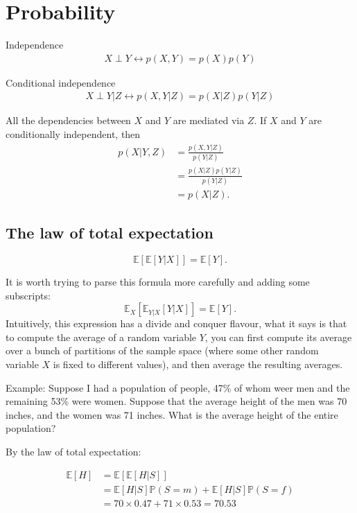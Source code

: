 \section{Probability}
\label{sec:intro_prob}

\begin{definition}{Independence}
	\begin{align*}
		X\perp Y \leftrightarrow p(X,Y)=p(X)p(Y)
	\end{align*}
\end{definition}
\begin{definition}{Conditional independence}
	\begin{align*}
		X\perp Y|Z \leftrightarrow p(X,Y|Z)=p(X|Z)p(Y|Z)
	\end{align*}
\end{definition}
All the dependencies between $X$ and $Y$ are mediated via $Z$. If $X$ and $Y$ are conditionally independent, then 
\begin{align*}
	p(X|Y,Z)&=\frac{p(X,Y|Z)}{p(Y|Z)}\\
	&=\frac{p(X|Z)p(Y|Z)}{p(Y|Z)}\\
	&=p(X|Z).
\end{align*}


\subsection{The law of total expectation}
$$\mathbb{E}[\mathbb{E}[Y|X]] = \mathbb{E}[Y].$$

It is worth trying to parse this formula more carefully and adding some subscripts:
$$\mathbb{E}_X[\mathbb{E}_{Y|X}[Y|X]] = \mathbb{E}[Y].$$
Intuitively, this expression has a divide and conquer flavour, \ie what it says is that to compute the average of a random variable $Y$, you can first compute its average over a bunch of partitions of the sample space (where some other random variable $X$ is fixed to different values), and then average the resulting averages. 

Example: Suppose I had a population of people, 47\% of whom weer men and the remaining 53\% were women. Suppose that the average height of the men was 70 inches, and the women was 71 inches. What is the average height of the entire population?

By the law of total expectation:

\begin{align*}
	\mathbb{E}[H] &= \mathbb{E}[\mathbb{E}[H|S]]\\
				  &= \mathbb{E}[H|S]\mathbb{P}(S=m) + \mathbb{E}[H|S]\mathbb{P}(S=f)\\
			   &= 70\times 0.47 + 71\times 0.53 = 70.53
\end{align*}

